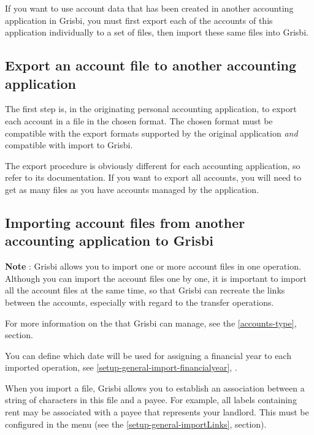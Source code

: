 If you want to use account data that has been created
in another accounting application in Grisbi, you must first export each of the accounts of this application individually to a set of files, then import these same files into Grisbi.

\subsection{Export an account file to another accounting application \label{move-import-exportinit}}

The first step is, in the originating personal accounting application, to export each account in a file in the chosen format. The chosen format must be compatible with the export formats supported by the original application \emph{and} compatible with import to Grisbi.

The export procedure is obviously different for each accounting application, so refer to its documentation. If you want to export all accounts, you will need to get as many files as you have accounts managed by the application.


\subsection{Importing account files from another accounting application to Grisbi\label{move-import-importinit}}

\textbf{Note} : Grisbi allows you to import one or more account files in one operation. Although you can import the account files one by one, it is important to import all the account files at the same time, so that Grisbi can recreate the links between the accounts, especially with regard to the transfer operations.

For more information on the  that Grisbi can manage, see the \vref{accounts-type},  section.

You can define which date will be used for assigning a financial year to
each imported operation, see \vref{setup-general-import-financialyear}, .

When you import a file, Grisbi allows you to establish an association between a string of characters in this file and a payee. For example, all labels containing \og rent \fg{}  may be associated with a payee that represents your landlord. This must be configured in the  menu (see the \vref{setup-general-importLinks},  section).

